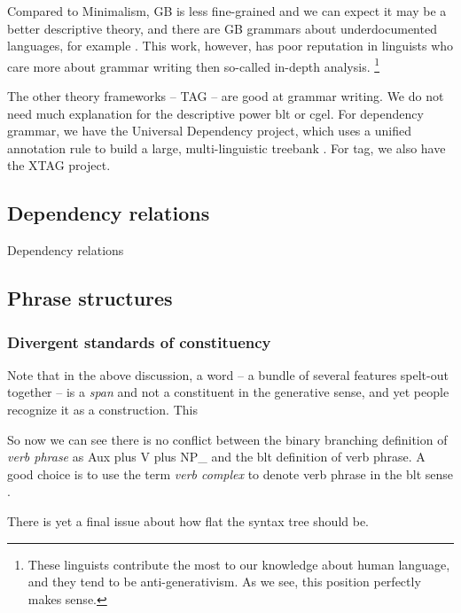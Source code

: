 \documentclass[../main.tex]{subfiles}
\begin{document}
Compared to Minimalism, GB is less fine-grained and we can expect it may be a better descriptive theory,
and there are GB grammars about underdocumented languages, for example \citet{holmer1996parametric}. 
This work, however, has poor reputation in linguists who care more about grammar writing then so-called in-depth
analysis. %
\footnote{
    These linguists contribute the most to our knowledge about human language, and they tend to 
    be anti-generativism. As we see, this position perfectly makes sense.
}

The other theory frameworks -- TAG -- are good at grammar writing. We do not need much explanation for 
the descriptive power \ac{blt} or \ac{cgel}. For dependency grammar, we have the Universal Dependency 
project, which uses a unified annotation rule to build a large, multi-linguistic treebank \citep{ud}.
For \ac{tag}, we also have the XTAG project. %

\subsection{Dependency relations}

Dependency relations


\subsection{Phrase structures}

\subsubsection{Divergent standards of constituency}

Note that in the above discussion, a word -- a bundle of several features spelt-out together -- is a \emph{span}
and not a constituent in the generative sense, and yet people recognize it as a construction. This %

So now we can see there is no conflict between the binary branching definition of \emph{verb phrase} as Aux plus V plus NP_{} and the \ac{blt} definition of verb phrase. A good choice is to use the term 
\emph{verb complex} to denote verb phrase in the \ac{blt} sense \citep{Wilbur2014}.

There is yet a final issue about how flat the syntax tree should be. %
\end{document}
